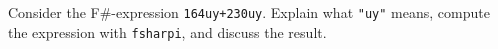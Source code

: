Consider the F\#-expression \lstinline{164uy+230uy}. Explain what \lstinline{"uy"} means, compute the expression with \lstinline[language=console]{fsharpi}, and discuss the result.
